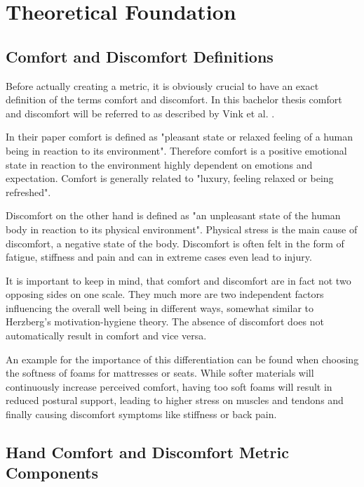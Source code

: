 
\usepackage{subfig}

\chapter{Theoretical Foundation}\label{chapter:theory}

\section{Comfort and Discomfort Definitions}

Before actually creating a metric, it is obviously crucial to have an exact definition of the terms comfort and discomfort. In this bachelor thesis comfort and discomfort will be referred to as described by Vink et al. \cite{vink2012editorial}.

In their paper comfort is defined as "pleasant state or relaxed feeling of a human being in reaction to its environment". Therefore comfort is a positive emotional state in reaction to the environment highly dependent on emotions and expectation. Comfort is generally related to "luxury, feeling relaxed or being refreshed".

Discomfort on the other hand is defined as "an unpleasant state of the human body in reaction to its physical environment". Physical stress is the main cause of discomfort, a negative state of the body. Discomfort is often felt in the form of fatigue, stiffness and pain and can in extreme cases even lead to injury.

It is important to keep in mind, that comfort and discomfort are in fact not two opposing sides on one scale. They much more are two independent factors influencing the overall well being in different ways, somewhat similar to Herzberg's motivation-hygiene theory. The absence of discomfort does not automatically result in comfort and vice versa. 

An example for the importance of this differentiation can be found when choosing the softness of foams for mattresses or seats. While softer materials will continuously increase perceived comfort, having too soft foams will result in reduced postural support, leading to higher stress on muscles and tendons and finally causing discomfort symptoms like stiffness or back pain. 

\section{Hand Comfort and Discomfort Metric Components}

